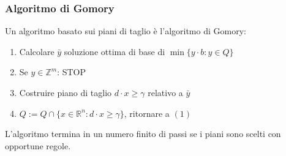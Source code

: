 \documentclass[a4paper,11pt]{book}
\newcommand{\reals}{\mathbb{R}}
\newcommand{\integers}{\mathbb{Z}}
\theoremstyle{break}
\begin{document}
\subsubsection*{Algoritmo di Gomory}
Un algoritmo basato sui piani di taglio è l'algoritmo di Gomory:
\begin{enumerate}
 \item Calcolare $\bar y$ soluzione ottima di base di $\min\{y\cdot b : y \in   Q\}$
 \item Se $y \in \integers^m$: STOP
 \item Costruire piano di taglio $d \cdot x \geq \gamma$ relativo a $\bar y$
 \item $Q := Q \cap \{x \in \reals^n : d \cdot x \geq \gamma\}$, ritornare a $(1)$
\end{enumerate}
L'algoritmo termina in un numero finito di passi se i piani sono scelti con opportune regole.
\newpage
\end{document}
